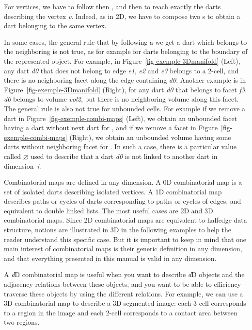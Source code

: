 For vertices, we have to follow \betadeux{} then \betaun{}, and
\betatrois{} then \betaun{} to reach exactly the darts describing the
vertex \emph{v}. Indeed, as in 2D, we have to compose two \betai{}s to
obtain a dart belonging to the same vertex.

In some cases, the general rule that by following a \betai{} we get a
dart which belongs to the neighboring  is not true, as for example
for darts belonging to the boundary of the represented
object. For example, in Figure~\ref{fig-exemple-3Dmanifold} (Left), any dart
\emph{d0} that does not belong to edge \emph{e1}, \emph{e2} and \emph{e3}
belongs to a 2-cell, and there is no neighboring facet along the edge containing \emph{d0}.
Another example is in Figure~\ref{fig-exemple-3Dmanifold} (Right), for
any dart \emph{d0} that belongs to facet \emph{f5}.
\emph{d0} belongs to volume \emph{vol2}, but there is no neighboring volume
along this facet.  The general rule is also not true for unbounded
cells. For example if we remove a dart in
Figure~\ref{fig-exemple-combi-maps} (Left), we obtain an unbounded
facet having a dart without next dart for \betaun{}, and if we remove
a facet in Figure~\ref{fig-exemple-combi-maps} (Right), we obtain an
unbounded volume having some darts without neighboring facet for
\betadeux{}.  In such a case, there is a particular value called
$\varnothing$ used to describe that a dart \emph{d0} is not linked to
another dart in dimension~\emph{i}.

Combinatorial maps are defined in any dimension. A 0D combinatorial
map is a set of isolated darts describing isolated vertices. A 1D
combinatorial map describes paths or cycles of darts corresponding to
paths or cycles of edges, and equivalent to double linked lists.  The
most useful cases are 2D and 3D combinatorial maps. Since 2D
combinatorial maps are equivalent to halfedge data structure, notions
are illustrated in 3D in the following examples to help the reader 
understand this specific case. But it is important to keep in mind
that one main interest of combinatorial maps is their generic
definition in any dimension, and that everything presented in this
manual is valid in any dimension.

A \emph{d}D combinatorial map is useful when you want to describe \emph{d}D
objects and the adjacency relations between these objects, and you
want to be able to efficiency traverse these objects by using the
different relations.  For example, we can use a 3D combinatorial map
to describe a 3D segmented image: each 3-cell corresponds to a region
in the image and each 2-cell corresponds to a contact area between two
regions.


